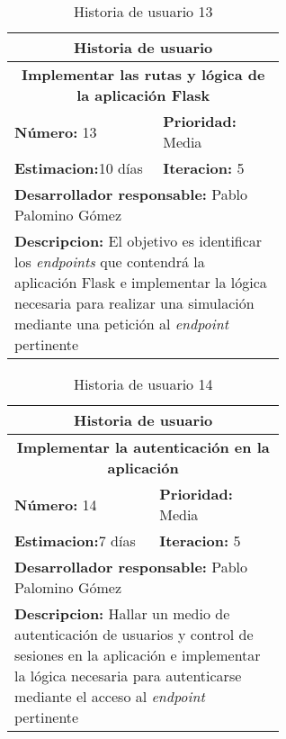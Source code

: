 \begin{table}[H]
        \centering
        \begin{tabular}{|p{0.3\linewidth}|p{0.3\linewidth}|}
          \hline
          \multicolumn{2}{|c|}{Historia de usuario}\\ \hline
          \multicolumn{2}{|c|}{\textbf{Implementar las rutas y lógica de la aplicación Flask}}\\ \hline
          \textbf{Número:} 13 & \textbf{Prioridad:} Media\\ \hline
          \textbf{Estimacion:}10 días & \textbf{Iteracion:} 5\\ \hline
          \multicolumn{2}{|l|}{\textbf{Desarrollador responsable:} Pablo Palomino Gómez}\\ \hline
          \multicolumn{2}{|p{0.6\linewidth}|}{\textbf{Descripcion:} El objetivo es identificar los \textit{endpoints} que contendrá la aplicación Flask e implementar la lógica necesaria para realizar una simulación mediante una petición al \textit{endpoint} pertinente}\\ \hline
        \end{tabular}
        \caption{Historia de usuario 13}
        \label{tab:hist13}
\end{table}
\begin{table}[H]
        \centering
        \begin{tabular}{|p{0.3\linewidth}|p{0.3\linewidth}|}
          \hline
          \multicolumn{2}{|c|}{Historia de usuario}\\ \hline
          \multicolumn{2}{|c|}{\textbf{Implementar la autenticación en la aplicación}}\\ \hline
          \textbf{Número:} 14 & \textbf{Prioridad:} Media\\ \hline
          \textbf{Estimacion:}7 días & \textbf{Iteracion:} 5\\ \hline
          \multicolumn{2}{|l|}{\textbf{Desarrollador responsable:} Pablo Palomino Gómez}\\ \hline
          \multicolumn{2}{|p{0.6\linewidth}|}{\textbf{Descripcion:} Hallar un medio de autenticación de usuarios y control de sesiones en la aplicación e implementar la lógica necesaria para autenticarse mediante el acceso al \textit{endpoint} pertinente}\\ \hline
        \end{tabular}
        \caption{Historia de usuario 14}
        \label{tab:hist14}
\end{table}
